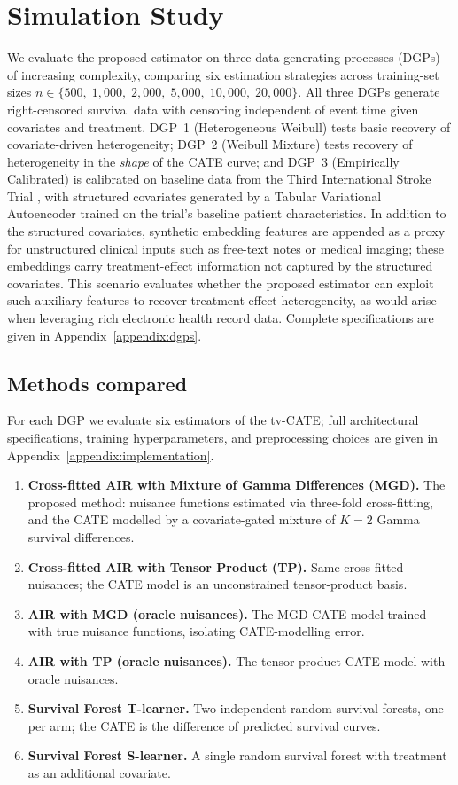 \documentclass{article}
\begin{document}
\section{Simulation Study}\label{sec:experiments}

We evaluate the proposed estimator on three data-generating processes (DGPs) of increasing complexity, comparing six estimation strategies across training-set sizes $n \in \{500,\; 1{,}000,\; 2{,}000,\; 5{,}000,\; 10{,}000,\; 20{,}000\}$.
All three DGPs generate right-censored survival data with censoring independent of event time given covariates and treatment.
DGP~1 (Heterogeneous Weibull) tests basic recovery of covariate-driven heterogeneity; DGP~2 (Weibull Mixture) tests recovery of heterogeneity in the \emph{shape} of the CATE curve; and DGP~3 (Empirically Calibrated) is calibrated on baseline data from the Third International Stroke Trial \citep{sandercock2012benefits}, with structured covariates generated by a Tabular Variational Autoencoder \citep{xu2019modeling} trained on the trial's baseline patient characteristics.
In addition to the structured covariates, synthetic embedding features are appended as a proxy for unstructured clinical inputs such as free-text notes or medical imaging; these embeddings carry treatment-effect information not captured by the structured covariates.
This scenario evaluates whether the proposed estimator can exploit such auxiliary features to recover treatment-effect heterogeneity, as would arise when leveraging rich electronic health record data.
Complete specifications are given in Appendix~\ref{appendix:dgps}.

\subsection{Methods compared}

For each DGP we evaluate six estimators of the tv-CATE; full architectural specifications, training hyperparameters, and preprocessing choices are given in Appendix~\ref{appendix:implementation}.
\begin{enumerate}
  \item \textbf{Cross-fitted AIR with Mixture of Gamma Differences (MGD).}  The proposed method: nuisance functions estimated via three-fold cross-fitting, and the CATE modelled by a covariate-gated mixture of $K=2$ Gamma survival differences.
  \item \textbf{Cross-fitted AIR with Tensor Product (TP).}  Same cross-fitted nuisances; the CATE model is an unconstrained tensor-product basis.
  \item \textbf{AIR with MGD (oracle nuisances).}  The MGD CATE model trained with true nuisance functions, isolating CATE-modelling error.
  \item \textbf{AIR with TP (oracle nuisances).}  The tensor-product CATE model with oracle nuisances.
  \item \textbf{Survival Forest T-learner.}  Two independent random survival forests, one per arm; the CATE is the difference of predicted survival curves.
  \item \textbf{Survival Forest S-learner.}  A single random survival forest with treatment as an additional covariate.
\end{enumerate}
\end{document}
